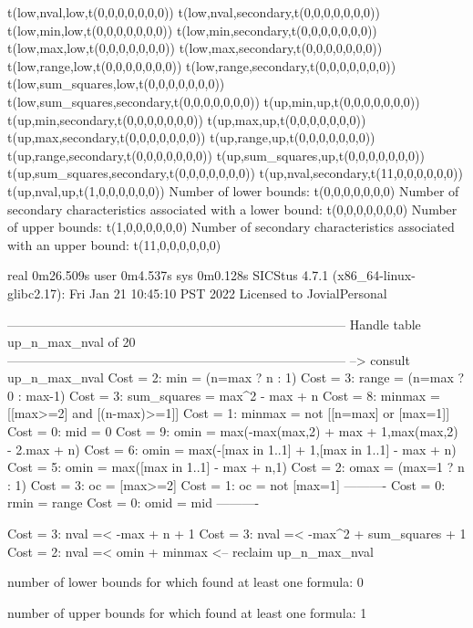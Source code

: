 t(low,nval,low,t(0,0,0,0,0,0,0))
t(low,nval,secondary,t(0,0,0,0,0,0,0))
t(low,min,low,t(0,0,0,0,0,0,0))
t(low,min,secondary,t(0,0,0,0,0,0,0))
t(low,max,low,t(0,0,0,0,0,0,0))
t(low,max,secondary,t(0,0,0,0,0,0,0))
t(low,range,low,t(0,0,0,0,0,0,0))
t(low,range,secondary,t(0,0,0,0,0,0,0))
t(low,sum_squares,low,t(0,0,0,0,0,0,0))
t(low,sum_squares,secondary,t(0,0,0,0,0,0,0))
t(up,min,up,t(0,0,0,0,0,0,0))
t(up,min,secondary,t(0,0,0,0,0,0,0))
t(up,max,up,t(0,0,0,0,0,0,0))
t(up,max,secondary,t(0,0,0,0,0,0,0))
t(up,range,up,t(0,0,0,0,0,0,0))
t(up,range,secondary,t(0,0,0,0,0,0,0))
t(up,sum_squares,up,t(0,0,0,0,0,0,0))
t(up,sum_squares,secondary,t(0,0,0,0,0,0,0))
t(up,nval,secondary,t(11,0,0,0,0,0,0))
t(up,nval,up,t(1,0,0,0,0,0,0))
Number of lower bounds:                                             t(0,0,0,0,0,0,0)
Number of secondary characteristics associated with a lower bound:  t(0,0,0,0,0,0,0)
Number of upper bounds:                                             t(1,0,0,0,0,0,0)
Number of secondary characteristics associated with an upper bound: t(11,0,0,0,0,0,0)

real	0m26.509s
user	0m4.537s
sys	0m0.128s
SICStus 4.7.1 (x86_64-linux-glibc2.17): Fri Jan 21 10:45:10 PST 2022
Licensed to JovialPersonal


--------------------------------------------------------------------------------
Handle table up_n_max_nval of 20
--------------------------------------------------------------------------------
--> consult up_n_max_nval
Cost =  2:  min         = (n=max ? n : 1)
Cost =  3:  range       = (n=max ? 0 : max-1)
Cost =  3:  sum_squares = max^2 - max + n
Cost =  8:  minmax      = [[max>=2] and [(n-max)>=1]]
Cost =  1:  minmax      = not [[n=max] or [max=1]]
Cost =  0:  mid         = 0
Cost =  9:  omin        = max(-max(max,2) + max + 1,max(max,2) - 2.max + n)
Cost =  6:  omin        = max(-[max in 1..1] + 1,[max in 1..1] - max + n)
Cost =  5:  omin        = max([max in 1..1] - max + n,1)
Cost =  2:  omax        = (max=1 ? n : 1)
Cost =  3:  oc          = [max>=2]
Cost =  1:  oc          = not [max=1]
----------
Cost =  0:  rmin        = range
Cost =  0:  omid        = mid
----------

Cost =  3:  nval =< -max + n + 1
Cost =  3:  nval =< -max^2 + sum_squares + 1
Cost =  2:  nval =< omin + minmax
<-- reclaim up_n_max_nval

number of lower bounds for which found at least one formula: 0

number of upper bounds for which found at least one formula: 1

